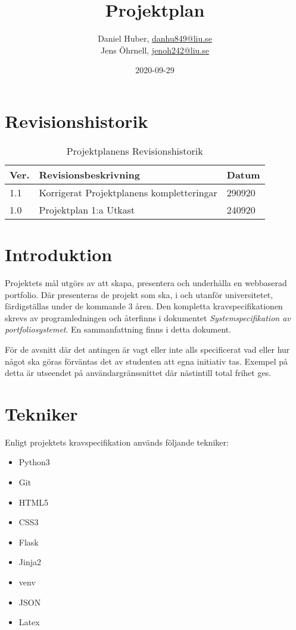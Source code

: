 \documentclass{TDP003mall}
\author{Daniel Huber, \url{danhu849@liu.se}\\
  Jens Öhrnell, \url{jenoh242@liu.se}}
\title{Projektplan}
\date{2020-09-29}
\begin{document}
\projectpage

\tableofcontents

\newpage
\section{Revisionshistorik}
\begin{table}[!h]
\begin{tabularx}{\linewidth}{|l|X|l|}
\hline
  Ver. & Revisionsbeskrivning & Datum \\\hline
  1.1 & Korrigerat Projektplanens kompletteringar & 290920 \\\hline
  1.0 & Projektplan 1:a Utkast & 240920 \\\hline
\end{tabularx}
\caption{Projektplanens Revisionshistorik\label{tab:1}}
\end{table}


\section{Introduktion}
Projektets mål utgörs av att skapa, presentera och underhålla en webbaserad portfolio. Där presenteras de projekt som ska, i och utanför universitetet, färdigställas under de kommande 3 åren. Den kompletta kravspecifikationen skrevs av programledningen och återfinns i dokumentet \textit{Systemspecifikation av portfoliosystemet}. En sammanfattning finns i detta dokument.

För de avsnitt där det antingen är vagt eller inte alls specificerat vad eller hur något ska göras förväntas det av studenten att egna initiativ tas. Exempel på detta är utseendet på användargränssnittet där nästintill total frihet ges.

\section{Tekniker}
Enligt projektets kravspecifikation används följande tekniker:
\begin{itemize}
\item Python3
\item Git
\item HTML5
\item CSS3
\item Flask
\item Jinja2
\item venv
\item JSON
\item Latex
\end{itemize}
\end{document}
